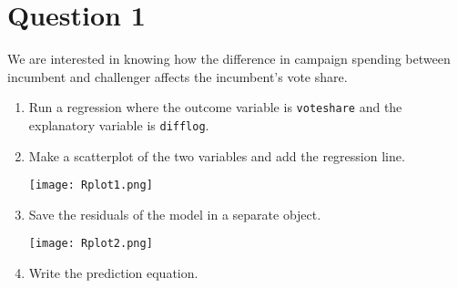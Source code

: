 \documentclass[12pt,letterpaper]{article}
\begin{document}
	\section*{Question 1} %
\vspace{.25cm}
\noindent We are interested in knowing how the difference in campaign spending between incumbent and challenger affects the incumbent's vote share. 
\begin{enumerate}
	\item Run a regression where the outcome variable is \texttt{voteshare} and the explanatory variable is \texttt{difflog}.	\vspace{5cm}
	
			  
			  
	
	\item Make a scatterplot of the two variables and add the regression line. 	\vspace{7cm}
	
			 
			
					\texttt{[image: Rplot1.png]}
				
	\item Save the residuals of the model in a separate object.	\vspace{7cm}
	
			 
			
					\texttt{[image: Rplot2.png]}
				
	\item Write the prediction equation.
	
				 
				
				
\end{enumerate}

\newpage
\end{document}

